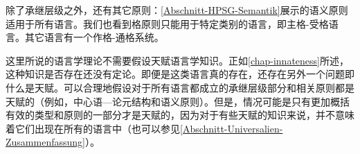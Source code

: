 
除了承继层级之外，还有其它原则：\ref{Abschnitt-HPSG-Semantik}展示的语义原则适用于所有语言。我们也看到格原则只能用于特定类别的语言，即主格-受格语言。其它语言有一个作格-通格系统。

这里所说的语言学理论不需要假设天赋语言学知识。正如\ref{chap-innateness}所述，这种知识是否存在还没有定论。即便是这类语言真的存在，还存在另外一个问题即什么是天赋。可以合理地假设对于所有语言都成立的承继层级部分和相关原则都是天赋的（例如，中心语—论元结构和语义原则）。但是，情况可能是只有更加概括有效的类型和原则的一部分才是天赋的，因为对于有些天赋的知识来说，并不意味着它们出现在所有的语言中（也可以参见\ref{Abschnitt-Universalien-Zusammenfassung}）。

